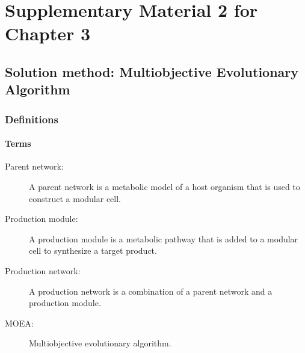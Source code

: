 \newcommand{\paragraphit}[1] {\paragraph{\textit{#1}}}

\renewcommand{\hbAppendixPrefix}{B}

\renewcommand{\thefigure}{\hbAppendixPrefix\arabic{figure}}
\setcounter{figure}{0}
\renewcommand{\thetable}{\hbAppendixPrefix\arabic{table}}
\setcounter{table}{0}
\renewcommand{\theequation}{\hbAppendixPrefix\arabic{equation}}
\setcounter{equation}{0}

\section{Supplementary Material 2 for Chapter 3}


%
%
%
%

\subsection{Solution method: Multiobjective Evolutionary Algorithm}

\subsubsection{Definitions}
\paragraph{Terms}
\begin{description}
\item[Parent network:] A parent network is a metabolic model of a host organism that is used to construct a modular cell.
\item[Production module:] A production module is a metabolic pathway that is added to a modular cell to synthesize a target product.
\item[Production network:] A production network is a combination of a parent network and a production module.
\item[MOEA:] Multiobjective evolutionary algorithm.
\end{description}

